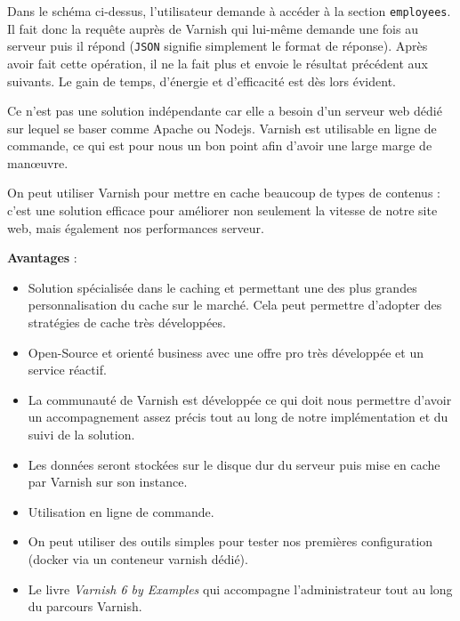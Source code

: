 \documentclass{article}
\begin{document}
\hspace{0.1cm}

Dans le schéma ci-dessus, l'utilisateur demande à accéder à la section \texttt{employees}. Il fait donc la requête auprès de Varnish qui lui-même demande une fois au serveur puis il répond (\texttt{JSON} signifie simplement le format de réponse).
Après avoir fait cette opération, il ne la fait plus et envoie le résultat précédent aux suivants. Le gain de temps, d'énergie et d'efficacité est dès lors évident.

Ce n’est pas une solution indépendante car elle a besoin d’un serveur web dédié sur lequel se baser comme Apache ou Nodejs.
Varnish est utilisable en ligne de commande, ce qui est pour nous un bon point afin d'avoir une large marge de manœuvre.

On peut utiliser Varnish pour mettre en cache beaucoup de types de contenus : c’est une solution efficace pour améliorer non seulement la vitesse de notre site web, mais également nos performances serveur.

\hspace{0.1cm}

{\bf Avantages} :\\
\begin{itemize}
    \item Solution spécialisée dans le caching et permettant une des plus grandes personnalisation du cache sur le marché. Cela peut permettre d'adopter des stratégies de cache très développées.
    \item Open-Source et orienté business avec une offre pro très développée et un service réactif.
    \item La communauté de Varnish est développée ce qui doit nous permettre d'avoir un accompagnement assez précis tout au long de notre implémentation et du suivi de la solution.
    \item Les données seront stockées sur le disque dur du serveur puis mise en cache par Varnish sur son instance. 
    \item Utilisation en ligne de commande.
    \item On peut utiliser des outils simples pour tester nos premières configuration (docker via un conteneur varnish dédié). 
    \item Le livre {\it Varnish 6 by Examples} qui accompagne l'administrateur tout au long du parcours Varnish.

\end{itemize}

\hspace{0.1cm}
\end{document}
